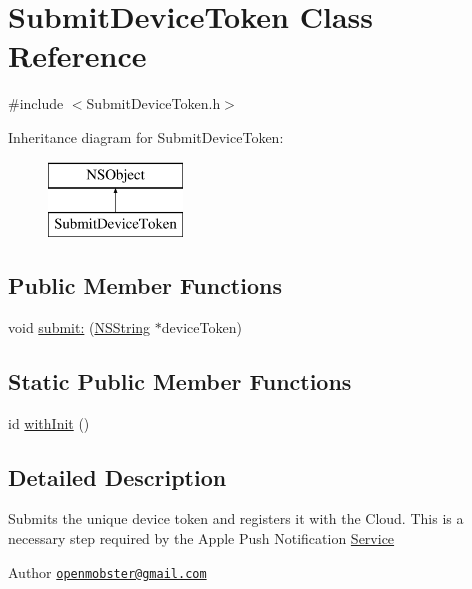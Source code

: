 \hypertarget{interface_submit_device_token}{
\section{\-Submit\-Device\-Token \-Class \-Reference}
\label{interface_submit_device_token}
}


{\ttfamily \#include $<$\-Submit\-Device\-Token.\-h$>$}

\-Inheritance diagram for \-Submit\-Device\-Token\-:\begin{figure}[H]
\begin{center}
\leavevmode
\includegraphics[height=2.000000cm]{interface_submit_device_token}
\end{center}
\end{figure}
\subsection*{\-Public \-Member \-Functions}
\begin{DoxyCompactItemize}
\item 
void \hyperlink{interface_submit_device_token_a14b1f002f93b0182c6d03cbf9f5a4b44}{submit\-:} (\hyperlink{class_n_s_string}{\-N\-S\-String} $\ast$device\-Token)
\end{DoxyCompactItemize}
\subsection*{\-Static \-Public \-Member \-Functions}
\begin{DoxyCompactItemize}
\item 
id \hyperlink{interface_submit_device_token_a3addec57fa29ebb0e338024bc9f2b6af}{with\-Init} ()
\end{DoxyCompactItemize}


\subsection{\-Detailed \-Description}
\-Submits the unique device token and registers it with the \-Cloud. \-This is a necessary step required by the \-Apple \-Push \-Notification \hyperlink{interface_service}{\-Service} \begin{DoxyAuthor}{\-Author}
\href{mailto:openmobster@gmail.com}{\tt openmobster@gmail.\-com} 
\end{DoxyAuthor}


